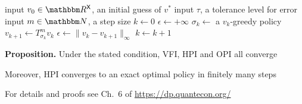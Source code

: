\documentclass[xcolor=tex,dvipsnames]{beamer}
\begin{document}
\begin{frame}
    
    {\small
    \begin{algorithm}[H]
        \DontPrintSemicolon
        \vspace{0.2em}
        input $v_0 \in \RR^\Xsf$, an initial guess of $v^*$ \;
        \vspace{0.2em}
        input $\tau$, a tolerance level for error \;
        \vspace{0.2em}
        input $m \in \NN$, a step size \;
        \vspace{0.2em}
        $k \leftarrow 0$ \;
        \vspace{0.2em}
        $\epsilon \leftarrow +\infty$ \;
        \vspace{0.2em}
        \While{$\epsilon > \tau $}
        {
            \vspace{0.2em}
            $\sigma_k \leftarrow $ a $v_k$-greedy policy \;
            \vspace{0.2em}
            $v_{k+1} \leftarrow T_{\sigma_k}^m v_k$  \;
            \vspace{0.2em}
            $\epsilon \leftarrow \| v_k - v_{k+1} \|_\infty$ \;
            \vspace{0.2em}
            $k \leftarrow k + 1$ \;
            \vspace{0.2em}
        }
        \vspace{0.2em}
        \caption{OPI}
    \end{algorithm}
    }

\end{frame}


\begin{frame}
    
    \vspace{0.4em}
    \vspace{0.4em}
    \vspace{0.4em}
    \begin{block}{\vspace*{-3ex}}
    {\bf Proposition.} Under the stated condition, VFI, HPI and OPI all converge
    \vspace{0.4em}
    \vspace{0.4em}

    Moreover, HPI converges to an exact optimal policy in finitely many steps
    \end{block}


    \vspace{0.4em}
    \vspace{0.4em}
    For details and proofs see Ch.\ 6 of \url{https://dp.quantecon.org/}


\end{frame}
\end{document}
